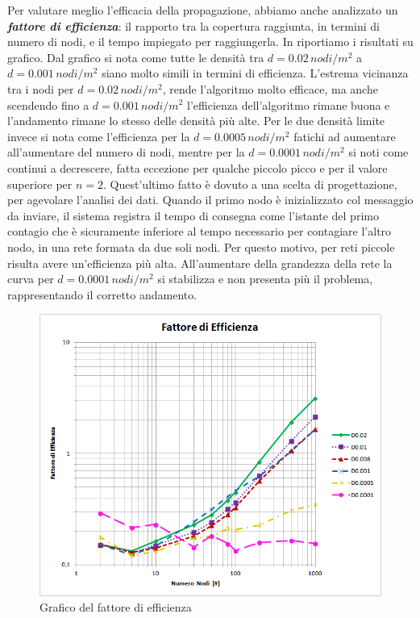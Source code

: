 Per valutare meglio l'efficacia della propagazione, abbiamo anche analizzato un \textit{\textbf{fattore di efficienza}}: il rapporto tra la copertura raggiunta, in termini di numero di nodi, e il tempo impiegato per raggiungerla. In  riportiamo i risultati su grafico. Dal grafico si nota come tutte le densità tra $d=0.02\, nodi/m^2$ a $d=0.001\, nodi/m^2$ siano molto simili in termini di efficienza. L'estrema vicinanza tra i nodi per $d=0.02\, nodi/m^2$, rende l'algoritmo molto efficace, ma anche scendendo fino a $d=0.001\, nodi/m^2$ l'efficienza dell'algoritmo rimane buona e l'andamento rimane lo stesso delle densità più alte. Per le due densità limite invece si nota come l'efficienza per la $d=0.0005\, nodi/m^2$ fatichi ad aumentare all'aumentare del numero di nodi, mentre per la $d=0.0001\, nodi/m^2$ si noti come continui a decrescere, fatta eccezione per qualche piccolo picco e per il valore superiore per $n=2$. Quest'ultimo fatto è dovuto a una scelta di progettazione, per agevolare l'analisi dei dati. Quando il primo nodo è inizializzato col messaggio da inviare, il sistema registra il tempo di consegna come l'istante del primo contagio che è sicuramente inferiore al tempo necessario per contagiare l'altro nodo, in una rete formata da due soli nodi. Per questo motivo, per reti piccole risulta avere un'efficienza più alta. All'aumentare della grandezza della rete la curva per $d=0.0001\, nodi/m^2$ si stabilizza e non presenta più il problema, rappresentando il corretto andamento.
\begin{figure}[t]
	\centering
	\includegraphics[width=0.9\linewidth]{"Images/risultati/fattore di efficienza_log"}
	\caption[Fattore di Efficienza]{Grafico del fattore di efficienza}
	\label{fig:fattorediefficienza_log}
\end{figure}

